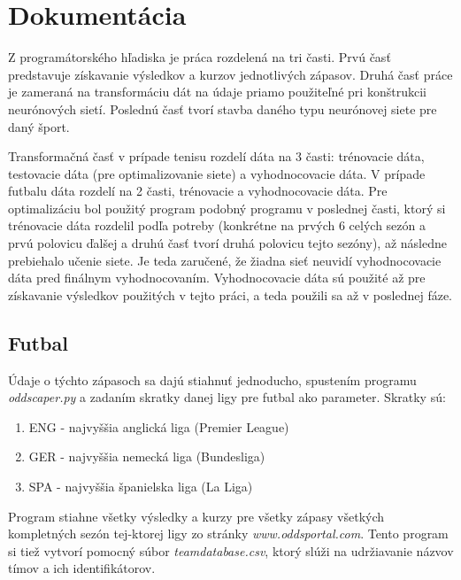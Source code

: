 \chapter{Dokumentácia} \label{docu}

Z programátorského hľadiska je práca rozdelená na tri časti. 
Prvú časť predstavuje získavanie výsledkov a kurzov jednotlivých zápasov. 
Druhá časť práce je zameraná na transformáciu dát na údaje priamo použiteľné pri konštrukcii neurónových sietí.
Poslednú časť tvorí stavba daného typu neurónovej siete pre daný šport.

Transformačná časť v prípade tenisu rozdelí dáta na 3 časti: trénovacie dáta, testovacie dáta (pre optimalizovanie siete) a vyhodnocovacie dáta.
V prípade futbalu dáta rozdelí na 2 časti, trénovacie a vyhodnocovacie dáta.
Pre optimalizáciu bol použitý program podobný programu v poslednej časti, ktorý si trénovacie dáta rozdelil podľa potreby (konkrétne na prvých 6 celých sezón a prvú polovicu ďalšej a druhú časť tvorí druhá polovicu tejto sezóny), až následne prebiehalo učenie siete.
Je teda zaručené, že žiadna sieť neuvidí vyhodnocovacie dáta pred finálnym vyhodnocovaním.
Vyhodnocovacie dáta sú použité až pre získavanie výsledkov použitých v tejto práci, a teda použili sa až v poslednej fáze.

\section{Futbal}

Údaje o týchto zápasoch sa dajú stiahnuť jednoducho, spustením programu \textit{oddscaper.py} a zadaním skratky danej ligy pre futbal ako parameter.
Skratky sú:
\begin{enumerate}
\item ENG - najvyššia anglická liga (Premier League)
\item GER - najvyššia nemecká liga (Bundesliga)
\item SPA - najvyššia španielska liga (La Liga)
\end{enumerate}
Program stiahne všetky výsledky a kurzy pre všetky zápasy všetkých kompletných sezón tej-ktorej ligy zo stránky \textit{www.oddsportal.com}.
Tento program si tiež vytvorí pomocný súbor \textit{teamdatabase.csv}, ktorý slúži na udržiavanie názvov tímov a ich identifikátorov.

